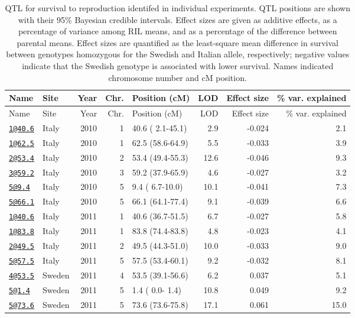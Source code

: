 \documentclass[
]{article}
\begin{document}
\begin{longtable}[]{@{}llrrlrrr@{}}
\caption{\label{tab:individual-surv-qtl}QTL for survival to reproduction identifed in individual experiments. QTL positions are shown with their 95\% Bayesian credible intervals. Effect sizes are given as additive effects, as a percentage of variance among RIL means, and as a percentage of the difference between parental means. Effect sizes are quantified as the least-square mean difference in survival between genotypes homozygous for the Swedish and Italian allele, respectively; negative values indicate that the Swedish genotype is associated with lower survival. Names indicated chromosome number and cM position.}\tabularnewline
\toprule
Name & Site & Year & Chr. & Position (cM) & LOD & Effect size & \% var. explained\tabularnewline
\midrule
\endfirsthead
\toprule
Name & Site & Year & Chr. & Position (cM) & LOD & Effect size & \% var. explained\tabularnewline
\midrule
\endhead
\href{mailto:1@40.6}{\nolinkurl{1@40.6}} & Italy & 2010 & 1 & 40.6 ( 2.1-45.1) & 2.9 & -0.024 & 2.1\tabularnewline
\href{mailto:1@62.5}{\nolinkurl{1@62.5}} & Italy & 2010 & 1 & 62.5 (58.6-64.9) & 5.5 & -0.033 & 3.9\tabularnewline
\href{mailto:2@53.4}{\nolinkurl{2@53.4}} & Italy & 2010 & 2 & 53.4 (49.4-55.3) & 12.6 & -0.046 & 9.3\tabularnewline
\href{mailto:3@59.2}{\nolinkurl{3@59.2}} & Italy & 2010 & 3 & 59.2 (37.9-65.9) & 4.6 & -0.027 & 3.2\tabularnewline
\href{mailto:5@9.4}{\nolinkurl{5@9.4}} & Italy & 2010 & 5 & 9.4 ( 6.7-10.0) & 10.1 & -0.041 & 7.3\tabularnewline
\href{mailto:5@66.1}{\nolinkurl{5@66.1}} & Italy & 2010 & 5 & 66.1 (64.1-77.4) & 9.1 & -0.039 & 6.6\tabularnewline
\href{mailto:1@40.6}{\nolinkurl{1@40.6}} & Italy & 2011 & 1 & 40.6 (36.7-51.5) & 6.7 & -0.027 & 5.8\tabularnewline
\href{mailto:1@83.8}{\nolinkurl{1@83.8}} & Italy & 2011 & 1 & 83.8 (74.4-83.8) & 4.8 & -0.023 & 4.1\tabularnewline
\href{mailto:2@49.5}{\nolinkurl{2@49.5}} & Italy & 2011 & 2 & 49.5 (44.3-51.0) & 10.0 & -0.033 & 9.0\tabularnewline
\href{mailto:5@57.5}{\nolinkurl{5@57.5}} & Italy & 2011 & 5 & 57.5 (53.4-60.1) & 9.2 & -0.032 & 8.1\tabularnewline
\href{mailto:4@53.5}{\nolinkurl{4@53.5}} & Sweden & 2011 & 4 & 53.5 (39.1-56.6) & 6.2 & 0.037 & 5.1\tabularnewline
\href{mailto:5@1.4}{\nolinkurl{5@1.4}} & Sweden & 2011 & 5 & 1.4 ( 0.0- 1.4) & 10.8 & 0.049 & 9.2\tabularnewline
\href{mailto:5@73.6}{\nolinkurl{5@73.6}} & Sweden & 2011 & 5 & 73.6 (73.6-75.8) & 17.1 & 0.061 & 15.0\tabularnewline
\bottomrule
\end{longtable}

\newpage
\end{document}
